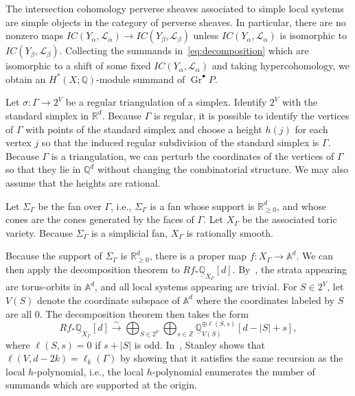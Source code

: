The intersection cohomology perverse sheaves associated to simple local systems are simple objects in the category of perverse sheaves. In particular, there are no nonzero maps $IC(Y_{\alpha}, \mathcal{L}_{\alpha}) \to IC(Y_{\beta}, \mathcal{L}_{\beta})$ unless $IC(Y_{\alpha}, \mathcal{L}_{\alpha})$ is isomorphic to  $IC(Y_{\beta}, \mathcal{L}_{\beta})$. Collecting the summands in~\eqref{eq:decomposition} which are isomorphic to a shift of some fixed $IC(Y_{\alpha}, \mathcal{L}_{\alpha})$ and taking hypercohomology, we obtain an $H^*(X; \mathbb{Q})$-module summand of $\operatorname{Gr}^{\bullet} P$. 

Let $\sigma \colon \Gamma \to 2^V$ be a regular triangulation of a simplex. Identify $2^V$ with the standard simplex in $\mathbb{R}^d$.
Because $\Gamma$ is regular, it is possible to identify the vertices of $\Gamma$ with points of the standard simplex and choose a height $h(j)$ for each vertex $j$ so that the induced regular subdivision of the standard simplex is $\Gamma$. 
Because $\Gamma$ is a triangulation, we can perturb the coordinates of the vertices of $\Gamma$ so that they lie in $\mathbb{Q}^d$ without changing the combinatorial structure. We may also assume that the heights are rational. 

Let $\Sigma_{\Gamma}$ be the fan over $\Gamma$, i.e., $\Sigma_{\Gamma}$ is a fan whose support is $\mathbb{R}^d_{\ge 0}$, and whose cones are the cones generated by the faces of $\Gamma$. Let $X_{\Gamma}$ be the associated toric variety. Because $\Sigma_{\Gamma}$ is a simplicial fan, $X_{\Gamma}$ is rationally smooth. 

Because the support of $\Sigma_{\Gamma}$ is $\mathbb{R}^d_{\ge 0}$, there is a proper 
map $f \colon X_{\Gamma} \to \mathbb{A}^d$. We can then apply the decomposition theorem to $Rf_* \underline{\mathbb{Q}}_{X_{\Gamma}}[d]$. By~\cite[Theorem 5.1]{deCataldoMiglioriniMustata18}, the strata appearing are torus-orbits in $\mathbb{A}^d$, and all local systems appearing are trivial. For $S \in 2^V$, let $V(S)$ denote the coordinate subspace of $\mathbb{A}^d$ where the coordinates labeled by $S$ are all $0$. 
The decomposition theorem then takes the form
$$Rf_* \underline{\mathbb{Q}}_{X_{\Gamma}}[d] \stackrel{\sim}{\to} \bigoplus_{S \in 2^V} \bigoplus_{s \in \mathbb{Z}} \underline{\mathbb{Q}}_{V(S)}^{\oplus \ell(S, s)}[d - |S| + s],$$
where $\ell(S, s) = 0$ if $s + |S|$ is odd. 
In~\cite[Section 5]{Stanleylocalh}, Stanley shows that $\ell(V, d-2k) = \ell_{k}(\Gamma)$ by showing that it satisfies the same recursion as the local $h$-polynomial, i.e., the local $h$-polynomial enumerates the number of summands which are supported at the origin. 


